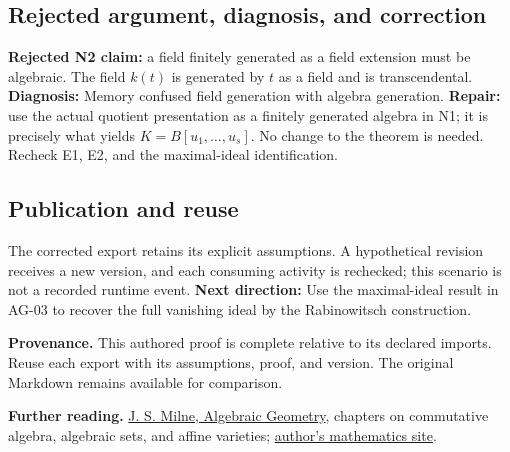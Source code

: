 \documentclass[preprint,12pt,aps,pra,showkeys,amsmath,amssymb,superscriptaddress,floatfix]{revtex4-2}
\theoremstyle{definition}
\theoremstyle{remark}
\begin{document}
\subsection{Rejected argument, diagnosis, and correction}
\textbf{Rejected N2 claim:} a field finitely generated as a field
extension must be algebraic. The field \(k(t)\) is generated by \(t\) as
a field and is transcendental. \textbf{Diagnosis:} Memory confused field
generation with algebra generation. \textbf{Repair:} use the actual
quotient presentation as a finitely generated algebra in N1; it is
precisely what yields \(K=B[u_1,\ldots,u_s]\). No change to the theorem
is needed. Recheck E1, E2, and the maximal-ideal identification.

\subsection{Publication and reuse}
The corrected export retains its explicit assumptions. A hypothetical
revision receives a new version, and each consuming activity is
rechecked; this scenario is not a recorded runtime event. \textbf{Next
direction:} Use the maximal-ideal result in AG-03 to recover the full
vanishing ideal by the Rabinowitsch construction.

\par\medskip\begingroup\small\linespread{1.0}\selectfont\noindent\textbf{Provenance.} This authored proof is complete relative to its declared imports. Reuse
each export with its assumptions, proof, and version. The original
Markdown remains available for comparison.
\par\endgroup

\par\smallskip\begingroup\small\linespread{1.0}\selectfont\noindent\textbf{Further reading.} \href{https://www.jmilne.org/math/CourseNotes/ag.html}{J. S. Milne,
Algebraic Geometry}, chapters on commutative algebra, algebraic sets,
and affine varieties; \href{https://www.jmilne.org/math/}{author's
mathematics site}.\par\endgroup
\end{document}
